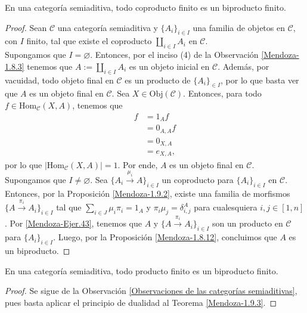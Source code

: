 \documentclass[tesis]{subfiles}
\begin{document}
\begin{Teo}\label{Mendoza-1.9.3}
    En una categoría semiaditiva, todo coproducto finito es un biproducto finito.
\end{Teo}

\begin{proof}
    Sean $\mathscr{C}$ una categoría semiaditiva y $\{A_i\}_{i\in I}$ una familia de objetos en $\mathscr{C}$, con $I$ finito, tal que existe el coproducto $\coprod_{i\in I}A_i$ en $\mathscr{C}$. \\

    Supongamos que $I=\varnothing$. Entonces, por el inciso (4) de la Observación \ref{Mendoza-1.8.3} tenemos que $A:=\coprod_{i\in I}A_i$ es un objeto inicial en $\mathscr{C}$. Además, por vacuidad, todo objeto final en $\mathscr{C}$ es un producto de $\{A_i\}_{\in I}$, por lo que basta ver que $A$ es un objeto final en $\mathscr{C}$. Sea $X\in\text{Obj}(\mathscr{C})$. Entonces, para todo $f\in\text{Hom}_\mathscr{C}(X,A)$, tenemos que
    \begin{align*}
        f &= 1_Af \\
          &= 0_{A,A}f \\
          &= 0_{X,A} \\
          &= e_{X,A},
    \end{align*}
    por lo que $|\text{Hom}_\mathscr{C}(X,A)|=1$. Por ende, $A$ es un objeto final en $\mathscr{C}$. \\

    Supongamos que $I\neq \varnothing$. Sea $\{A_i\xrightarrow[]{\mu_i} A\}_{i\in I}$ un coproducto para $\{A_i\}_{i\in I}$ en $\mathscr{C}$. Entonces, por la Proposición \ref{Mendoza-1.9.2}, existe una familia de morfismos $\{A\xrightarrow[]{\pi_i} A_i\}_{i\in I}$ tal que $\sum_{i\in J} \mu_i\pi_i = 1_A$ y $\pi_i\mu_j=\delta_{i,j}^A$ para cualesquiera $i,j\in[1,n]$. Por \ref{Mendoza-Ejer.43}, tenemos que $A$ y $\{A\xrightarrow[]{\pi_i} A_i\}_{i\in I}$ son un producto en $\mathscr{C}$ para $\{A_i\}_{i\in I}$. Luego, por la Proposición \ref{Mendoza-1.8.12}, concluimos que $A$ es un biproducto.
\end{proof}

\begin{Coro}\label{Mendoza-1.9.3*}
    En una categoría semiaditiva, todo producto finito es un biproducto finito.
\end{Coro}

\begin{proof}
    Se sigue de la Observación \ref{Observaciones de las categorías semiaditivas}, pues basta aplicar el principio de dualidad al Teorema \ref{Mendoza-1.9.3}.
\end{proof}
\end{document}
